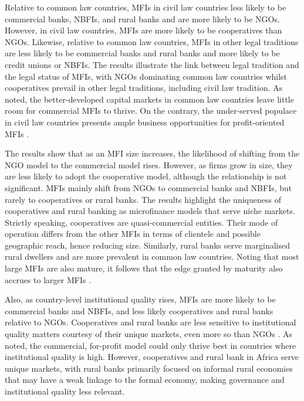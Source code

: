 \documentclass[a4paper, nobind]{templates/ociamthesis}
\begin{document}
Relative to common law countries, MFIs in civil law countries less likely to be commercial banks, NBFIs, and rural banks and are more likely to be NGOs. However, in civil law countries, MFIs are more likely to be cooperatives than NGOs. Likewise, relative to common law countries, MFIs in other legal traditions are less likely to be commercial banks and rural banks and more likely to be credit unions or NBFIs. The results illustrate the link between legal tradition and the legal status of MFIs, with NGOs dominating common law countries whilst cooperatives prevail in other legal traditions, including civil law tradition. As noted, the better-developed capital markets in common law countries leave little room for commercial MFIs to thrive. On the contrary, the under-served populace in civil law countries presents ample business opportunities for profit-oriented MFIs \autocite{d2013unsubsidized,mia2017mission}.

The results show that as an MFI size increases, the likelihood of shifting from the NGO model to the commercial model rises. However, as firms grow in size, they are less likely to adopt the cooperative model, although the relationship is not significant. MFIs mainly shift from NGOs to commercial banks and NBFIs, but rarely to cooperatives or rural banks. The results highlight the uniqueness of cooperatives and rural banking as microfinance models that serve niche markets. Strictly speaking, cooperatives are quasi-commercial entities. Their mode of operation differs from the other MFIs in terms of clientele and possible geographic reach, hence reducing size. Similarly, rural banks serve marginalised rural dwellers and are more prevalent in common law countries. Noting that most large MFIs are also mature, it follows that the edge granted by maturity also accrues to larger MFIs \autocite{beck2014sme,kersten2017small}.

Also, as country-level institutional quality rises, MFIs are more likely to be commercial banks and NBFIs, and less likely cooperatives and rural banks relative to NGOs. Cooperatives and rural banks are less sensitive to institutional quality matters courtesy of their unique markets, even more so than NGOs \autocite{sobel2008testing}. As noted, the commercial, for-profit model could only thrive best in countries where institutional quality is high. However, cooperatives and rural bank in Africa serve unique markets, with rural banks primarily focused on informal rural economies that may have a weak linkage to the formal economy, making governance and institutional quality less relevant.
\end{document}
